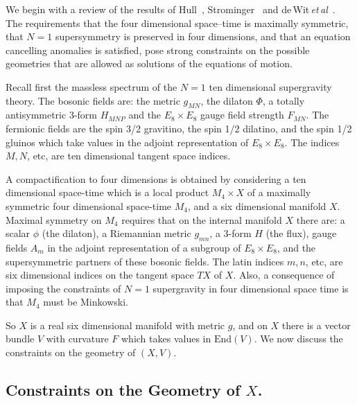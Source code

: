 \documentclass[12pt,a4paper]{article}
\def\End{\textrm{End}}
\theoremstyle{definition}
\begin{document}
We begin with a review of the results of Hull~\citep{Hull:1986kz}, Strominger~\citep{Strominger:1986uh} and 
de\,Wit\,{\it et\,al}~\citep{deWit:1986xg}.
The requirements that the four dimensional space--time is maximally symmetric, that $N=1$ supersymmetry is preserved in four dimensions, and that  an equation cancelling anomalies is satisfied, pose strong constraints on the possible geometries that are allowed as solutions of the equations of motion.   

Recall first the massless spectrum of the $N=1$ ten dimensional supergravity theory.  The bosonic fields are: the metric $g_{MN}$, the dilaton $\Phi$, a totally antisymmetric 3-form $H_{MNP}$ and the $E_8{\times}E_8$ gauge field strength $F_{MN}$.  The fermionic fields are the spin 3/2 gravitino, the spin 1/2 dilatino, and the spin 1/2 gluinos which take values in the adjoint representation of $E_8{\times}E_8$.   The indices $M, N$, etc, are ten dimensional tangent space indices.

A compactification to four dimensions is obtained by considering a ten dimensional space-time which is a local product $M_4\times X$ of a maximally symmetric four dimensional space-time $M_4$, and a six dimensional manifold $X$.  Maximal symmetry on $M_4$ requires that on the internal manifold $X$ there are: a scalar $\phi$ (the dilaton),  a Riemannian metric $g_{mn}$, a 3-form $H$ (the flux),  gauge fields $A_m$ in the adjoint representation of a subgroup of $E_8{\times}E_8$, and the supersymmetric partners of these bosonic fields.  The latin indices $m,n$, etc, are six dimensional indices on the tangent space $TX$ of $X$.  Also, a consequence of imposing the constraints of  $N=1$ supergravity in four dimensional space time is that $M_4$ must be Minkowski. 

So $X$ is a real six dimensional manifold with metric $g$,  and on $X$ there is a vector bundle $V$ with curvature $F$ which takes values in $\End(V)$.  We now discuss the constraints on the geometry of $(X,V)$. 

\subsection{Constraints on the Geometry of \texorpdfstring{$X$}\ .}
\label{subsec:Xgeom}
\end{document}
